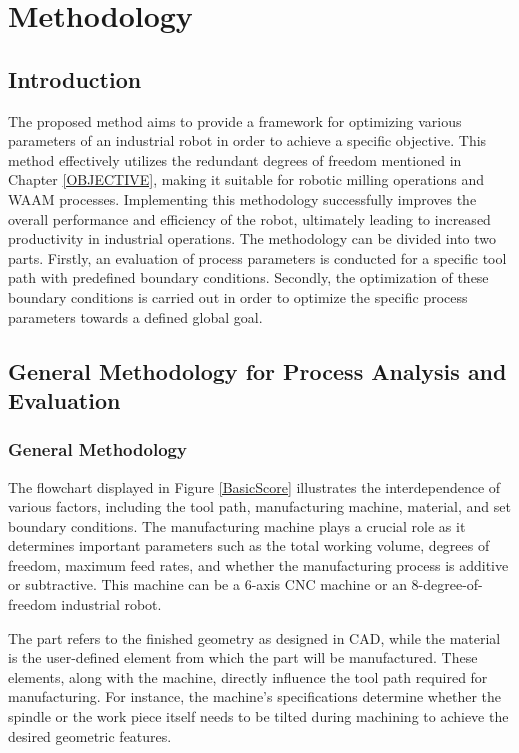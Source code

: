 \chapter{Methodology}%

\section{Introduction}%

The proposed method aims to provide a framework for optimizing various parameters of an industrial robot in order to achieve a specific objective. This method effectively utilizes the redundant degrees of freedom mentioned in Chapter \ref{OBJECTIVE}, making it suitable for robotic milling operations and WAAM processes. Implementing this methodology successfully improves the overall performance and efficiency of the robot, ultimately leading to increased productivity in industrial operations. The methodology can be divided into two parts. Firstly, an evaluation of process parameters is conducted for a specific tool path with predefined boundary conditions. Secondly, the optimization of these boundary conditions is carried out in order to optimize the specific process parameters towards a defined global goal.

\section{General Methodology for Process Analysis and Evaluation}
\subsection{General Methodology}\label{general}

The flowchart displayed in Figure \ref{BasicScore} illustrates the interdependence of various factors, including the tool path, manufacturing machine, material, and set boundary conditions. The manufacturing machine plays a crucial role as it determines important parameters such as the total working volume, degrees of freedom, maximum feed rates, and whether the manufacturing process is additive or subtractive. This machine can be a 6-axis CNC machine or an 8-degree-of-freedom industrial robot.

The part refers to the finished geometry as designed in CAD, while the material is the user-defined element from which the part will be manufactured. These elements, along with the machine, directly influence the tool path required for manufacturing. For instance, the machine's specifications determine whether the spindle or the work piece itself needs to be tilted during machining to achieve the desired geometric features.

